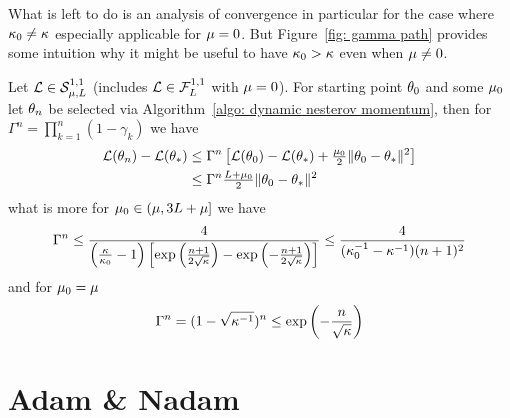 What is left to do is an analysis of convergence in particular for the case
where \(\kappa_0\neq\kappa\) especially applicable for \(\mu=0\).
But Figure~\ref{fig: gamma path} provides some intuition why it might be useful to
have \(\kappa_0>\kappa\) even when \(\mu\neq0\).

\begin{theorem}
	Let \(\mathcal{L} \in \mathcal{S}^{1,1}_{{\mu},{L}}\) (includes
	\(\mathcal{L}\in\mathcal{F}^{1,1}_{L}\) with \(\mu=0\)). For starting point
	\(\theta_0\) and some \(\mu_0\) let
	\(\theta_n\) be selected via Algorithm~\ref{algo: dynamic nesterov
	momentum}, then for \(\Gamma^n=\prod_{k=1}^n(1-\gamma_k)\) we have
	\begin{align*}
		\mathcal{L}(\theta_n) - \mathcal{L}(\theta_*)
		&\le \Gamma^n\left[
			\mathcal{L}(\theta_0) -\mathcal{L}(\theta_*)
			+ \tfrac{\mu_0}2\|\theta_0-\theta_*\|^2
		\right] \\
		&\le \Gamma^n \tfrac{L + \mu_0}{2}\|\theta_0-\theta_*\|^2
	\end{align*}
	what is more for \(\mu_0\in (\mu, 3L + \mu]\) we have
	\begin{align*}
		\Gamma^n
		\le \frac{4}{\left(\frac{\kappa}{\kappa_0}-1\right)\left[
			\exp\left(\frac{n+1}{2\sqrt{\kappa}}\right)
			-\exp\left(-\frac{n+1}{2\sqrt{\kappa}}\right)
		\right]}
		\le \frac{4}{(\kappa_0^{-1}-\kappa^{-1})(n+1)^2}
	\end{align*}
	and for \(\mu_0 = \mu\)
	\begin{align*}
		\Gamma^n = (1-\sqrt{\kappa^{-1}})^n
		\le \exp\left(-\frac{n}{\sqrt{\kappa}}\right)
	\end{align*}
\end{theorem}


\section{Adam \& Nadam}


\endinput
